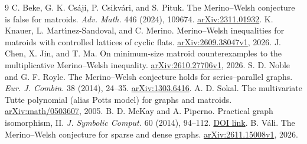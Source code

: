 \documentclass[11pt]{article}
\begin{document}
\begin{thebibliography}{9}
\setlength{\itemsep}{0.18em}
 C. Beke, G. K. Csáji, P. Csikvári, and S. Pituk.
The Merino--Welsh conjecture is false for matroids.
\emph{Adv. Math.} 446 (2024), 109674.
\href{https://arxiv.org/abs/2311.01932}{arXiv:2311.01932}.
 K. Knauer, L. Mart{\'\i}nez-Sandoval, and C. Merino.
Merino--Welsh inequalities for matroids with controlled lattices of
cyclic flats.
\href{https://arxiv.org/html/2609.38047v1}{arXiv:2609.38047v1}, 2026.
 J. Chen, X. Jin, and T. Ma.
On minimum-size matroid counterexamples to the multiplicative
Merino--Welsh inequality.
\href{https://arxiv.org/html/2610.27706v1\#S5}{arXiv:2610.27706v1}, 2026.
 S. D. Noble and G. F. Royle.
The Merino--Welsh conjecture holds for series--parallel graphs.
\emph{Eur. J. Combin.} 38 (2014), 24--35.
\href{https://arxiv.org/abs/1303.6416}{arXiv:1303.6416}.
 A. D. Sokal. The multivariate Tutte polynomial
(alias Potts model) for graphs and matroids.
\href{https://arxiv.org/abs/math/0503607}{arXiv:math/0503607}, 2005.
 B. D. McKay and A. Piperno.
Practical graph isomorphism, II.
\emph{J. Symbolic Comput.} 60 (2014), 94--112.
\href{https://doi.org/10.1016/j.jsc.2013.09.003}{DOI link}.
 B. Váli. The Merino--Welsh conjecture for sparse
and dense graphs. \href{https://arxiv.org/abs/2611.15008v1}{arXiv:2611.15008v1}, 2026.
\end{thebibliography}
\end{document}
